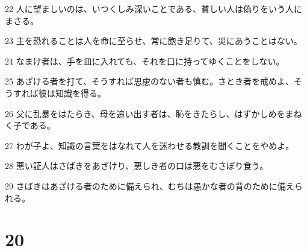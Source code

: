 \par 22 人に望ましいのは、いつくしみ深いことである、貧しい人は偽りをいう人にまさる。
\par 23 主を恐れることは人を命に至らせ、常に飽き足りて、災にあうことはない。
\par 24 なまけ者は、手を皿に入れても、それを口に持ってゆくことをしない。
\par 25 あざける者を打て、そうすれば思慮のない者も慎む。さとき者を戒めよ、そうすれば彼は知識を得る。
\par 26 父に乱暴をはたらき、母を追い出す者は、恥をきたらし、はずかしめをまねく子である。
\par 27 わが子よ、知識の言葉をはなれて人を迷わせる教訓を聞くことをやめよ。
\par 28 悪い証人はさばきをあざけり、悪しき者の口は悪をむさぼり食う。
\par 29 さばきはあざける者のために備えられ、むちは愚かな者の背のために備えられる。

\chapter{20}

